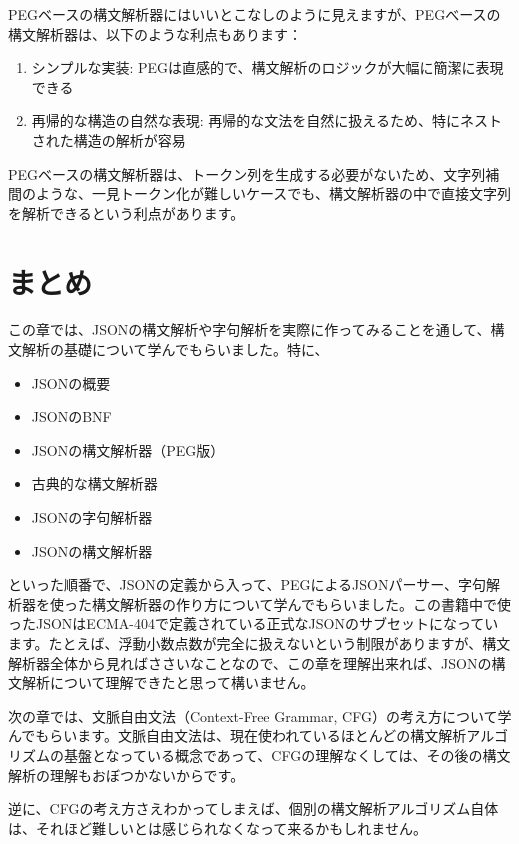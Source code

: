 PEGベースの構文解析器にはいいとこなしのように見えますが、PEGべースの構文解析器は、以下のような利点もあります：

\begin{enumerate}
\def\labelenumi{\arabic{enumi}.}
\tightlist
\item
  シンプルな実装:
  PEGは直感的で、構文解析のロジックが大幅に簡潔に表現できる
\item
  再帰的な構造の自然な表現:
  再帰的な文法を自然に扱えるため、特にネストされた構造の解析が容易
\end{enumerate}

PEGベースの構文解析器は、トークン列を生成する必要がないため、文字列補間のような、一見トークン化が難しいケースでも、構文解析器の中で直接文字列を解析できるという利点があります。

\hypertarget{chapter3-ux307eux3068ux3081}{%
\section{まとめ}\label{chapter3-ux307eux3068ux3081}}

この章では、JSONの構文解析や字句解析を実際に作ってみることを通して、構文解析の基礎について学んでもらいました。特に、

\begin{itemize}
\tightlist
\item
  JSONの概要
\item
  JSONのBNF
\item
  JSONの構文解析器（PEG版）
\item
  古典的な構文解析器
\item
  JSONの字句解析器
\item
  JSONの構文解析器
\end{itemize}

といった順番で、JSONの定義から入って、PEGによるJSONパーサー、字句解析器を使った構文解析器の作り方について学んでもらいました。この書籍中で使ったJSONはECMA-404で定義されている正式なJSONのサブセットになっています。たとえば、浮動小数点数が完全に扱えないという制限がありますが、構文解析器全体から見ればささいなことなので、この章を理解出来れば、JSONの構文解析について理解できたと思って構いません。

次の章では、文脈自由文法（Context-Free Grammar,
CFG）の考え方について学んでもらいます。文脈自由文法は、現在使われているほとんどの構文解析アルゴリズムの基盤となっている概念であって、CFGの理解なくしては、その後の構文解析の理解もおぼつかないからです。

逆に、CFGの考え方さえわかってしまえば、個別の構文解析アルゴリズム自体は、それほど難しいとは感じられなくなって来るかもしれません。


